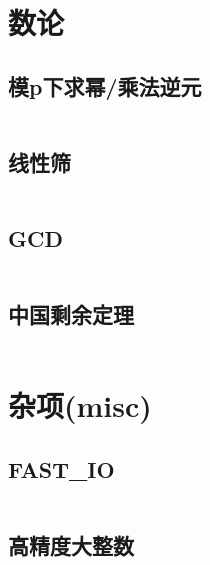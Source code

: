 \documentclass[openany,a4paper]{article}
\begin{document}
\section{数论}

\subsection{模p下求幂/乘法逆元}
\inputminted{cpp}{model/NumberTheory/modPow.h}

\subsection{线性筛}
\inputminted{cpp}{model/NumberTheory/linearSieve.h}

\subsection{GCD}
\inputminted{cpp}{model/NumberTheory/exgcd.h}

\subsection{中国剩余定理}
\inputminted{cpp}{model/NumberTheory/CRT.h}

\section{杂项(misc)}

\subsection{FAST\_IO}
\inputminted{cpp}{model/misc/fast_io.h}

\subsection{高精度大整数}
\inputminted{cpp}{model/misc/BigInt.h}
\end{document}
